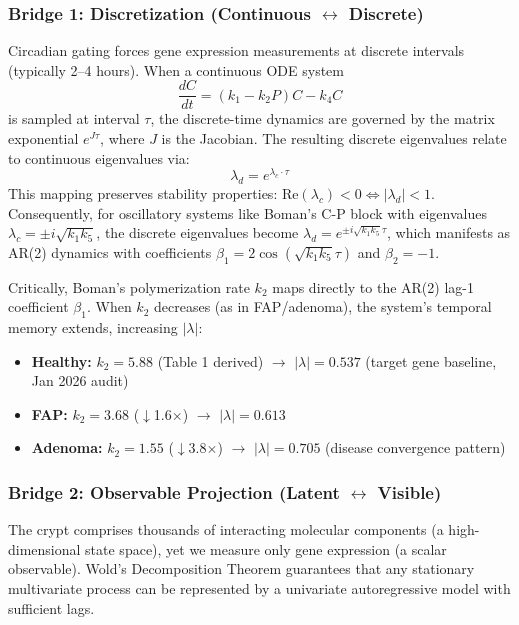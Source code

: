 \documentclass[11pt,a4paper]{article}
\begin{document}
\subsubsection{Bridge 1: Discretization (Continuous $\leftrightarrow$ Discrete)}

Circadian gating forces gene expression measurements at discrete intervals (typically 2--4 hours). When a continuous ODE system
\begin{equation}
\frac{dC}{dt} = (k_1 - k_2 P)C - k_4 C
\end{equation}
is sampled at interval $\tau$, the discrete-time dynamics are governed by the matrix exponential $e^{J\tau}$, where $J$ is the Jacobian. The resulting discrete eigenvalues relate to continuous eigenvalues via:
\begin{equation}
\lambda_d = e^{\lambda_c \cdot \tau}
\label{eq:eigenvalue_mapping}
\end{equation}
This mapping preserves stability properties: $\text{Re}(\lambda_c) < 0 \Leftrightarrow |\lambda_d| < 1$. Consequently, for oscillatory systems like Boman's C-P block with eigenvalues $\lambda_c = \pm i\sqrt{k_1 k_5}$, the discrete eigenvalues become $\lambda_d = e^{\pm i\sqrt{k_1 k_5} \tau}$, which manifests as AR(2) dynamics with coefficients $\beta_1 = 2\cos(\sqrt{k_1 k_5} \tau)$ and $\beta_2 = -1$.

Critically, Boman's polymerization rate $k_2$ maps directly to the AR(2) lag-1 coefficient $\beta_1$. When $k_2$ decreases (as in FAP/adenoma), the system's temporal memory extends, increasing $|\lambda|$:
\begin{itemize}
    \item \textbf{Healthy:} $k_2 = 5.88$ (Table 1 derived) $\rightarrow$ $|\lambda| = 0.537$ (target gene baseline, Jan 2026 audit)
    \item \textbf{FAP:} $k_2 = 3.68$ ($\downarrow$1.6$\times$) $\rightarrow$ $|\lambda| = 0.613$
    \item \textbf{Adenoma:} $k_2 = 1.55$ ($\downarrow$3.8$\times$) $\rightarrow$ $|\lambda| = 0.705$ (disease convergence pattern)
\end{itemize}

\subsubsection{Bridge 2: Observable Projection (Latent $\leftrightarrow$ Visible)}

The crypt comprises thousands of interacting molecular components (a high-dimensional state space), yet we measure only gene expression (a scalar observable). Wold's Decomposition Theorem \citep{wold1938study} guarantees that any stationary multivariate process can be represented by a univariate autoregressive model with sufficient lags.
\end{document}
